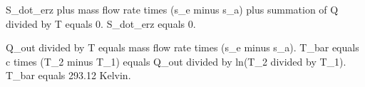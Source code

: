 S_dot_erz plus mass flow rate times (s_e minus s_a) plus summation of Q divided by T equals 0.  
S_dot_erz equals 0.  

Q_out divided by T equals mass flow rate times (s_e minus s_a).  
T_bar equals c times (T_2 minus T_1) equals Q_out divided by ln(T_2 divided by T_1).  
T_bar equals 293.12 Kelvin.